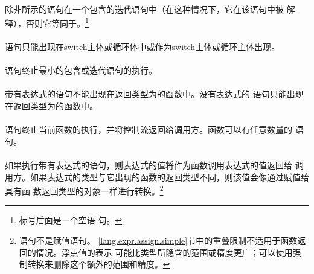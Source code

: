 {\begin{minipage}{0.30\linewidth}
  \mbox{\hspace{2em}}                                           \\
  \mbox{\hspace{2em}}                                           \\
  \mbox{\hspace{2em}}                                           \\
\mbox{\hspace{0em}}                                               \\
\mbox{\hspace{0em}\tm{\}}}
\end{minipage}                                                              \\\\
除非所示的语句在一个包含的迭代语句中（在这种情况下，它在该语句中被
解释），否则它等同于。\footnote{标号后面是一个空语
句。}

\constraint
\paragraph{}
语句只能出现在switch主体或循环体中或作为switch主体或循环主体出现。

\semantic
\paragraph{}
语句终止最小的包含或迭代语句的执行。

\constraint
\paragraph{}
带有表达式的语句不能出现在返回类型为的函数中。没有表达式的
语句只能出现在返回类型为的函数中。

\semantic
\paragraph{}
语句终止当前函数的执行，并将控制流返回给调用方。函数可以有任意数量的
语句。

\paragraph{}
如果执行带有表达式的语句，则表达式的值将作为函数调用表达式的值返回给
调用方。如果表达式的类型与它出现的函数的返回类型不同，则该值会像通过赋值给具有函
数返回类型的对象一样进行转换。\footnote{语句不是赋值语句。
\ref{lang.expr.assign.simple}节中的重叠限制不适用于函数返回的情况。浮点值的表示
可能比类型所隐含的范围或精度更广；可以使用强制转换来删除这个额外的范围和精度。}

}
